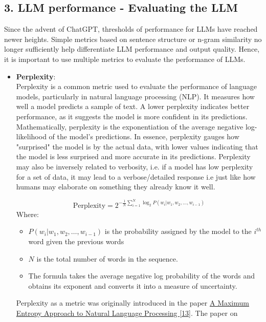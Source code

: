 \documentclass[12pt]{article}
\begin{document}
    \subsection*{3. LLM performance - Evaluating the LLM}
    Since the advent of ChatGPT, thresholds of performance for LLMs have reached newer heights. Simple metrics based on sentence structure or n-gram similarity no longer sufficiently help differentiate LLM performance and output quality. Hence, it is important to use multiple metrics to evaluate the performance of LLMs.
    \begin{itemize}
        \item \textbf{Perplexity}: \\
        Perplexity is a common metric used to evaluate the performance of language models, particularly in natural language processing (NLP). It measures how well a model predicts a sample of text. A lower perplexity indicates better performance, as it suggests the model is more confident in its predictions. Mathematically, perplexity is the exponentiation of the average negative log-likelihood of the model's predictions. In essence, perplexity gauges how "surprised" the model is by the actual data, with lower values indicating that the model is less surprised and more accurate in its predictions.
        Perplexity may also be inversely related to verbosity, i.e. if a model has low perplexity for a set of data, it may lead to a verbose/detailed response i.e just like how humans may elaborate on something they already know it well.

        \[\text{Perplexity} = 2^{-\frac{1}{N} \sum_{i=1}^{N} \log_2 P(w_i | w_1, w_2, \dots, w_{i-1})} \]
        Where:
        \begin{itemize}
            \item \textbf{\(P(w_i | w_1, w_2, \dots, w_{i-1})\)} is the probability assigned by the model to the \(i^{th}\) word given the previous words
            \item \textbf{\(N\)} is the total number of words in the sequence.
            \item The formula takes the average negative log probability of the words and obtains its exponent and converts it into a measure of uncertainty.
        \end{itemize}

        Perplexity as a metric was originally introduced in the paper \href{https://aclanthology.org/J96-1002.pdf}{A Maximum Entropy Approach
        to Natural Language Processing [13]}. The paper on


\end{itemize}
\end{document}
